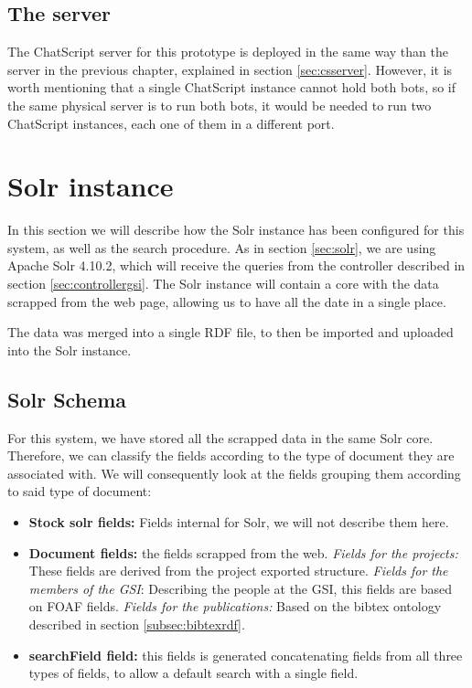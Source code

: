 \subsection{The server}

The ChatScript server for this prototype is deployed in the same way than the server in the previous chapter, explained in section \ref{sec:csserver}. However, it is worth mentioning that a single ChatScript instance cannot hold both bots, so if the same physical server is to run both bots, it would be needed to run two ChatScript instances, each one of them in a different port.

\section{Solr instance}

In this section we will describe how the Solr instance has been configured for this system, as well as the search procedure. As in section \ref{sec:solr}, we are using Apache Solr 4.10.2, which will receive the queries from the controller described in section \ref{sec:controllergsi}. The Solr instance will contain a core with the data scrapped from the web page, allowing us to have all the date in a single place.

The data was merged into a single RDF file, to then be imported and uploaded into the Solr instance.

\subsection{Solr Schema}

For this system, we have stored all the scrapped data in the same Solr core. Therefore, we can classify the fields according to the type of document they are associated with. We will consequently look at the fields grouping them according to said type of document:

\begin{itemize}
 \item \textbf{Stock solr fields:} Fields internal for Solr, we will not describe them here.
 \item \textbf{Document fields:} the fields scrapped from the web.
    \subitem \emph{Fields for the projects:} These fields are derived from the project exported structure.
    \subitem \emph{Fields for the members of the GSI}: Describing the people at the GSI, this fields are based on \ac{FOAF} fields.
    \subitem \emph{Fields for the publications:} Based on the bibtex ontology described in section \ref{subsec:bibtexrdf}.
 \item \textbf{searchField field:} this fields is generated concatenating fields from all three types of fields, to allow a default search with a single field.
\end{itemize}

